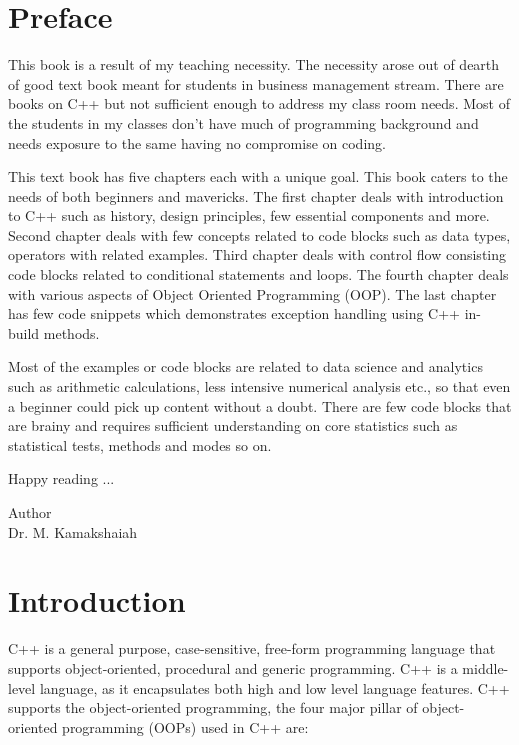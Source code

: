 \documentclass{book}
\begin{document}
\tableofcontents

\chapter*{Preface}

This book is a result of my teaching necessity. The necessity arose out of dearth of good text book meant for students in business management stream. There are books on C++ but not sufficient enough to address my class room needs. Most of the students in my classes don't have much of programming background and needs exposure to the same having no compromise on coding. 

This text book has five chapters each with a unique goal. This book caters to the needs of both beginners and mavericks. The first chapter deals with introduction to C++ such as history, design principles, few essential components and more. Second chapter deals with few concepts related to code blocks such as data types, operators with related examples. Third chapter deals with control flow consisting code blocks related to conditional statements and loops. The fourth chapter deals with various aspects of Object Oriented Programming (OOP). The last chapter has few code snippets which demonstrates exception handling using C++ in-build methods. 

Most of the examples or code blocks are related to data science and analytics such as arithmetic calculations, less intensive numerical analysis etc., so that even a beginner could pick up content without a doubt. There are few code blocks that are brainy and requires sufficient understanding on core statistics such as statistical tests, methods and modes so on. 

Happy reading ...

\begin{flushright}
	Author \\
	Dr. M. Kamakshaiah
\end{flushright}

\chapter{Introduction}

C++ is a general purpose, case-sensitive, free-form programming language that supports object-oriented, procedural and generic programming. C++ is a middle-level language, as it encapsulates both high and low level language features. C++ supports the object-oriented programming, the four major pillar of object-oriented programming (OOPs) used in C++ are:
\end{document}
